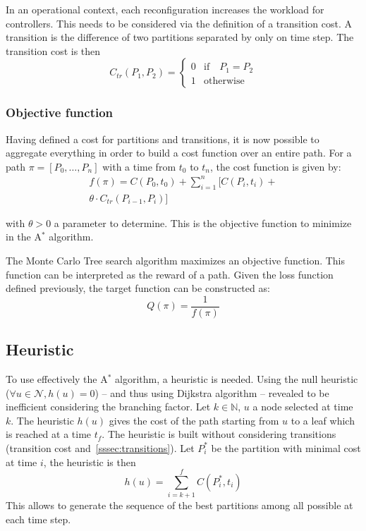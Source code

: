 \documentclass[oneside,twocolumn]{article}
\begin{document}
In an operational context, each reconfiguration increases the workload for
controllers. This needs to be considered via the definition of a transition
cost.
A transition is the difference of two partitions separated by only on time step.
The transition cost is then
\begin{equation}
  C_{tr}(P_1, P_2) =
  \begin{cases}
    0 & \text{if} \quad P_1 = P_2\\
    1 & \text{otherwise}
  \end{cases}
\end{equation}

\subsubsection{Objective function}

Having defined a cost for partitions and transitions, it is now possible to
aggregate everything in order to build a cost function over an entire
path. For a path $\pi = [P_0, \dots, P_n]$ with a time from $t_0$ to $t_n$,
the cost function is given by:
\begin{equation}
  \begin{split}
    f(\pi) = C(P_0, t_0) + \sum_{i = 1}^{n} [C(P_i, t_i) +\\
    \theta \cdot C_{tr}(P_{i-1}, P_i)]
  \end{split}
\end{equation}

with $\theta > 0$ a parameter to determine.
This is the objective function to minimize in the A$^*$ algorithm.

The Monte Carlo Tree search algorithm maximizes an objective function. This function
can be interpreted as the reward of a path.
Given the loss function defined previously, the target function can be
constructed as:
\begin{equation}
  Q(\pi) = \frac{1}{f(\pi)}
\end{equation}


\subsection{Heuristic}
To use effectively the A\(^*\) algorithm, a heuristic is needed. Using the null
heuristic (\(\forall u \in \mathcal{N}, h(u) = 0\)) -- and thus using Dijkstra
algorithm -- revealed to be inefficient
considering the branching factor. Let \(k \in \mathbb{N}\), \(u\) a node
selected at time \(k\).
The heuristic \(h(u)\) gives the cost of the path starting from \(u\) to a
leaf which is reached at a time \(t_f\).
The heuristic is built without
considering transitions (transition cost and~\ref{sssec:transitions}).
Let \(P^*_i\) be the partition with minimal cost at time \(i\), the heuristic is
then
\begin{equation}
  h(u) = \sum_{i=k+1}^f C(P^*_i, t_i)
\end{equation}
This allows to generate
the sequence of the best partitions among all possible at each time step.
\end{document}
